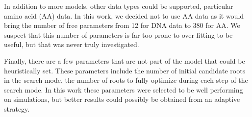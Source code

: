 \documentclass{article}
\begin{document}
In addition to more models, other data types could be supported, particular
amino acid (AA) data. In this work, we decided not to use AA data as it would
bring the number of free parameters from 12 for DNA data to $380$ for AA. We
suspect that this number of parameters is far too prone to over fitting to be
useful, but that was never truly investigated.

Finally, there are a few parameters that are not part of the model that could be
heuristically set. These parameters include the number of initial candidate
roots in the search mode, the number of roots to fully optimize during each step
of the search mode. In this work these parameters were selected to be well
performing on simulations, but better results could possibly be obtained from an
adaptive strategy.



\end{document}
